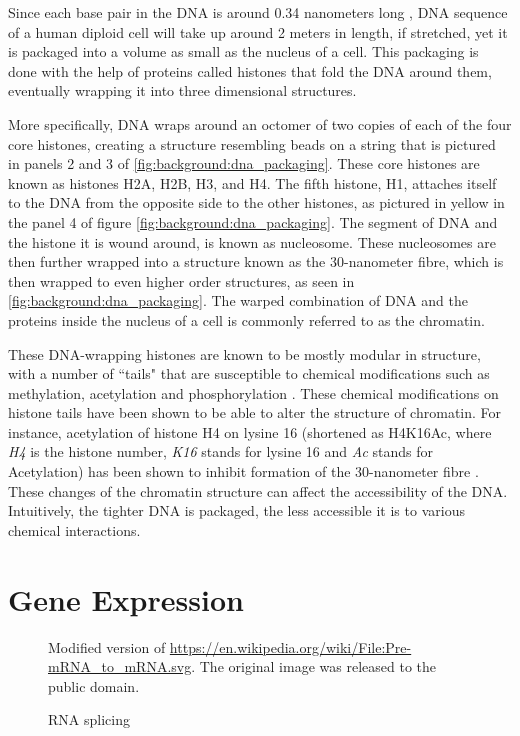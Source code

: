 \documentclass[parskip]{cs4rep}
\newcommand{\histonemodification}[1]{#1}
\begin{document}
Since each base pair in the DNA is around 0.34 nanometers long \cite{Annunziato:2008wh},
DNA sequence of a human diploid cell will take up around 2 meters in length, if stretched, yet it is packaged into a volume as small as the nucleus of a cell. This packaging is done with the help of proteins called histones that fold the DNA around them, eventually wrapping it into three dimensional structures.

More specifically, DNA wraps around an octomer of two copies of each of the four core histones, creating a structure resembling beads on a string that is pictured in panels 2 and 3 of \autoref{fig:background:dna_packaging}. These core histones are known as histones H2A, H2B, H3, and H4.
The fifth histone, H1, attaches itself to the DNA from the opposite side to the other histones, as pictured in yellow in the panel 4 of figure \ref{fig:background:dna_packaging}. The segment of DNA and the histone it is wound around, is known as nucleosome. These nucleosomes are then further wrapped into a structure known as the 30-nanometer fibre, which is then  wrapped to even higher order structures, as seen in \autoref{fig:background:dna_packaging}. The warped combination of DNA and the proteins inside the nucleus of a cell is commonly referred to as the chromatin.

These DNA-wrapping histones are known to be mostly modular in structure, with a number of ``tails" that are susceptible to chemical modifications such as methylation, acetylation and phosphorylation \cite{Fischle:2003tl,Kouzarides:2007js}. These chemical modifications on histone tails have been shown to be able to alter the structure of chromatin. For instance, acetylation of histone H4 on lysine 16 (shortened as \histonemodification{H4K16Ac}, where \emph{H4} is the histone number, \emph{K16} stands for lysine 16 and \emph{Ac} stands for Acetylation) has been shown to inhibit formation of the 30-nanometer fibre \cite{ShogrenKnaak:2006gt}. These changes of the chromatin structure can affect the accessibility of the DNA. Intuitively, the tighter DNA is packaged, the less accessible it is to various chemical interactions.

\section{Gene Expression}
\begin{figure}[t]
\centering
{}
{\centering Modified version of \url{https://en.wikipedia.org/wiki/File:Pre-mRNA_to_mRNA.svg}. The original image was released to the public domain.}
\caption{RNA splicing}
\label{fig:background:splicing}
\end{figure}
\end{document}
